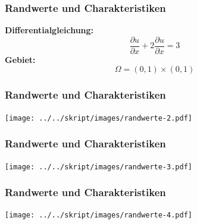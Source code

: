 \documentclass{beamer}
\begin{document}
\begin{frame}
\frametitle{Randwerte und Charakteristiken}

{\bf Differentialgleichung:}
\[
\frac{\partial u}{\partial x}
+
2\frac{\partial u}{\partial x}
= 3
\]
{\bf Gebiet:}
\[
\Omega = (0,1)\times(0,1)
\]
\end{frame}

\begin{frame}
\frametitle{Randwerte und Charakteristiken}
\begin{center}
\texttt{[image: ../../skript/images/randwerte-2.pdf]}
\end{center}
\end{frame}

\begin{frame}
\frametitle{Randwerte und Charakteristiken}
\begin{center}
\texttt{[image: ../../skript/images/randwerte-3.pdf]}
\end{center}
\end{frame}

\begin{frame}
\frametitle{Randwerte und Charakteristiken}
\begin{center}
\texttt{[image: ../../skript/images/randwerte-4.pdf]}
\end{center}
\end{frame}
\end{document}
